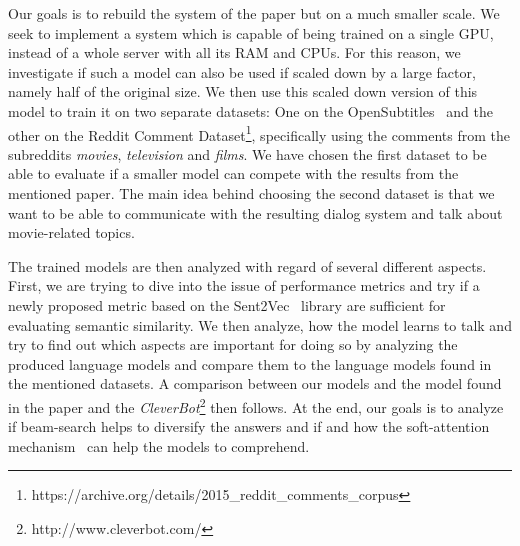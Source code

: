 Our goals is to rebuild the system of the paper but on a much smaller scale. We seek to implement a system which is capable of being trained on a single GPU, instead of a whole server with all its RAM and CPUs. For this reason, we investigate if such a model can also be used if scaled down by a large factor, namely half of the original size. We then use this scaled down version of this model to train it on two separate datasets: One on the OpenSubtitles~\cite{Lison:2016} and the other on the Reddit Comment Dataset\footnote{https://archive.org/details/2015\_reddit\_comments\_corpus}, specifically using the comments from the subreddits \emph{movies}, \emph{television} and \emph{films}. We have chosen the first dataset to be able to evaluate if a smaller model can compete with the results from the mentioned paper. The main idea behind choosing the second dataset is that we want to be able to communicate with the resulting dialog system and talk about movie-related topics.

The trained models are then analyzed with regard of several different aspects. First, we are trying to dive into the issue of performance metrics and try if a newly proposed metric based on the Sent2Vec~\cite{Pgj:2017} library are sufficient for evaluating semantic similarity. We then analyze, how the model learns to talk and try to find out which aspects are important for doing so by analyzing the produced language models and compare them to the language models found in the mentioned datasets. A comparison between our models and the model found in the paper and the \emph{CleverBot}\footnote{http://www.cleverbot.com/} then follows. At the end, our goals is to analyze if beam-search helps to diversify the answers and if and how the soft-attention mechanism~\cite{Bahdanau:2014} can help the models to comprehend.